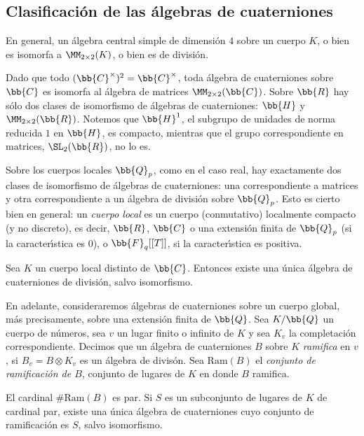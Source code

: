 \subsection{Clasificaci\'{o}n de las \'{a}lgebras de cuaterniones}
En general, un \'{a}lgebra central simple de dimensi\'{o}n $4$ sobre
un cuerpo $K$, o bien es isomorfa a $\MM_{2\times 2}(K)$, o bien es de
divisi\'{o}n.

Dado que todo $(\bb{C}^{\times})^{2}=\bb{C}^{\times}$, toda \'{a}lgebra de
cuaterniones sobre $\bb{C}$ es isomorfa al \'{a}lgebra de matrices
$\MM_{2\times 2}(\bb{C})$. Sobre $\bb{R}$ hay s\'{o}lo dos clases de
isomorfismo de \'{a}lgebras de cuaterniones: $\bb{H}$ y
$\MM_{2\times 2}(\bb{R})$. Notemos que $\bb{H}^{1}$, el subgrupo de unidades
de norma reducida $1$ en $\bb{H}$, es compacto, mientras que
el grupo correspondiente en matrices, $\SL_{2}(\bb{R})$, no lo es.

Sobre los cuerpos locales $\bb{Q}_{p}$, como en el caso real, hay
exactamente dos clases de isomorfismo de \'{a}lgebras de cuaterniones:
una correspondiente a matrices y otra correspondiente a un \'{a}lgebra de
divisi\'{o}n sobre $\bb{Q}_{p}$. Esto es cierto bien en general:
un \emph{cuerpo local} es un cuerpo (conmutativo) localmente compacto
(y no discreto), es decir, $\bb{R}$, $\bb{C}$ o una extensi\'{o}n
finita de $\bb{Q}_{p}$ (si la caracter\'{\i}stica es $0$), o $\bb{F}_{q}[[T]]$,
si la caracter\'{\i}stica es positiva.

\begin{teoClassificationSurUnCorpsLocal}
 Sea $K$ un cuerpo local distinto de $\bb{C}$. Entonces existe una \'{u}nica
 \'{a}lgebra de cuaterniones de divisi\'{o}n, salvo isomorfismo.
\end{teoClassificationSurUnCorpsLocal}

En adelante, consideraremos \'{a}lgebras de cuaterniones sobre un cuerpo
global, m\'{a}s precisamente, sobre una extensi\'{o}n finita de $\bb{Q}$.
Sea $K/\bb{Q}$ un cuerpo de n\'{u}meros, sea $v$ un lugar finito o infinito
de $K$ y sea $K_{v}$ la completaci\'{o}n correspondiente.
Decimos que un \'{a}lgebra de cuaterniones $B$ sobre $K$ \emph{ramifica}
en $v$, si $B_{v}=B\otimes K_{v}$ es un \'{a}lgebra de divis\'{o}n.
Sea $\mathrm{Ram}(B)$ el \emph{conjunto de ramificaci\'{o}n de $B$},
conjunto de lugares de $K$ en donde $B$ ramifica.

\begin{teoClassificationSurUnCorpsGlobal}
 El cardinal $\#\mathrm{Ram}(B)$ es par. Si $S$ es un subconjunto de lugares
 de $K$ de cardinal par, existe una \'{u}nica \'{a}lgebra de cuaterniones
 cuyo conjunto de ramificaci\'{o}n es $S$, salvo isomorfismo.
\end{teoClassificationSurUnCorpsGlobal}

